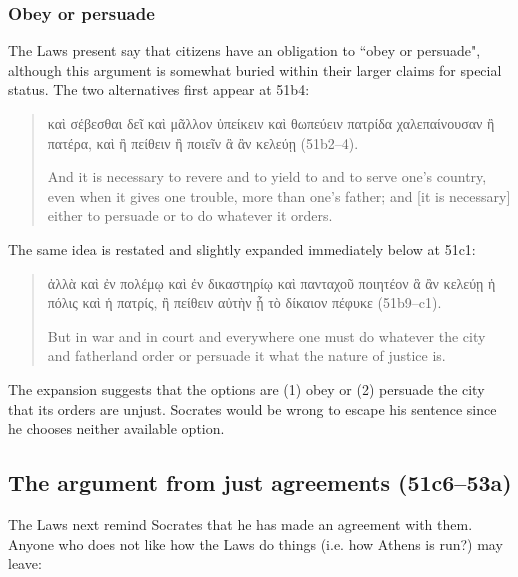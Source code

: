 \documentclass[11pt]{article}
\begin{document}

\subsubsection{Obey or persuade}

The Laws present say that citizens have an obligation to ``obey or persuade",
although this argument is somewhat buried within their larger claims for
special status.  The two alternatives first appear at 51b4:

\begin{quote}
    {\g καὶ σέβεσθαι δεῖ καὶ μᾶλλον ὑπείκειν καὶ θωπεύειν πατρίδα χαλεπαίνουσαν
    ἢ πατέρα, καὶ ἢ πείθειν ἢ ποιεῖν ἃ ἂν κελεύῃ} (51b2--4).

    And it is necessary to revere and to yield to and to serve one's country,
    even when it gives one trouble, more than one's father; and [it is
    necessary] either to persuade or to do whatever it orders.
\end{quote}

The same idea is restated and slightly expanded immediately below at 51c1:

\begin{quote}
    {\g ἀλλὰ καὶ ἐν πολέμῳ καὶ ἐν δικαστηρίῳ καὶ πανταχοῦ ποιητέον ἃ ἂν κελεύῃ
    ἡ πόλις καὶ ἡ πατρίς, ἢ πείθειν αὐτὴν ᾗ τὸ δίκαιον πέφυκε} (51b9--c1).

    But in war and in court and everywhere one must do whatever the city and
    fatherland order or persuade it what the nature of justice is.
\end{quote}

The expansion suggests that the options are (1) obey or (2) persuade the city
that its orders are unjust. Socrates would be wrong to escape his sentence
since he chooses neither available option.



\subsection{The argument from just agreements (51c6--53a)}

The Laws next remind Socrates that he has made an agreement with them.  Anyone
who does not like how the Laws do things (i.e. how Athens is run?) may leave:
\end{document}
